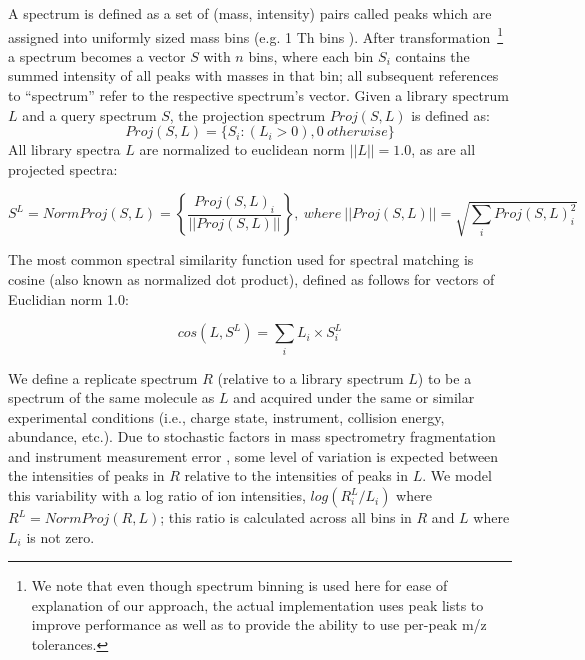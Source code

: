\documentclass[endnotes,11pt]{article}
\begin{document}
A spectrum is defined as a set of (mass, intensity) pairs called peaks which are assigned into uniformly sized mass bins (e.g. 1 Th bins \cite{frewen06}). After transformation~\footnote{We note that even though spectrum binning is used here for ease of explanation of our approach, the actual implementation uses peak lists to improve performance as well as to provide the ability to use per-peak m/z tolerances.} a spectrum becomes a vector $S$ with $n$ bins, where each bin $S_i$ contains the summed intensity of all peaks with masses in that bin; all subsequent references to ``spectrum'' refer to the respective spectrum's vector. Given a library spectrum $L$ and a query spectrum $S$, the projection spectrum $Proj(S,L)$ is defined as:
$$
Proj(S,L) = \{{S_i : (L_i > 0), 0 \ otherwise\}}
$$
All library spectra $L$ are normalized to euclidean norm $||L|| = 1.0$, as are all projected spectra:


$$
S^L = NormProj(S,L) = \left\{ \frac{Proj(S,L)_i} {||Proj(S,L)||} \right\}, \ where \ ||Proj(S,L)|| = \sqrt {\sum_{i}{Proj(S,L)_i^2 } }
$$

The most common spectral similarity function used for spectral matching is cosine (also known as normalized dot product), defined as follows for vectors of Euclidian norm 1.0:

$$
cos(L,S^L) = \sum_{i}{L_i \times S^L_i}
$$

We define a replicate spectrum $R$ (relative to a library spectrum $L$) to be a spectrum of the same molecule as $L$ and acquired under the same or similar  experimental conditions (i.e., charge state, instrument, collision energy, abundance, etc.). Due to stochastic factors in mass spectrometry fragmentation and instrument measurement error \cite{venable04}, some level of variation is expected between the intensities of peaks in $R$ relative to the intensities of peaks in $L$. We model this variability with a log ratio of ion intensities, $log ( R^L_i / L_i )$ where $R^L = NormProj(R,L)$; this ratio is calculated across all bins in $R$ and $L$ where $L_i$ is not zero.
\end{document}
